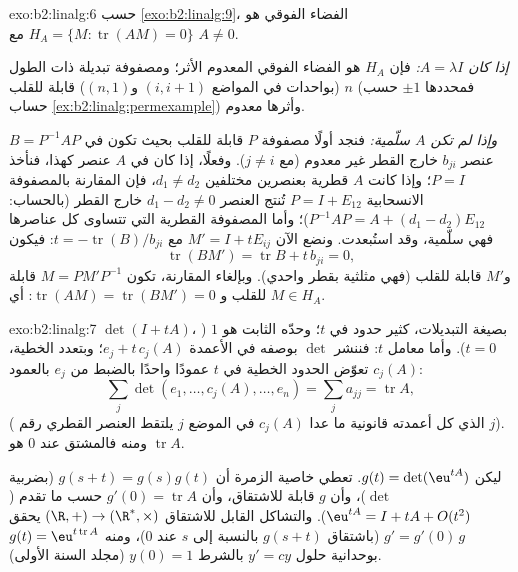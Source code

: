 \begin{solution}{exo:b2:linalg:6}
حسب \cref{exo:b2:linalg:9}، الفضاء الفوقي هو $H_A = \{M :
\operatorname{tr}(AM) = 0\}$ مع $A \neq 0$.

\emph{إذا كان $A = \lambda I$:} فإن $H_A$ هو الفضاء الفوقي المعدوم الأثر؛
ومصفوفة تبديلة  ذات الطول $n$ (بواحدات في المواضع $(i, i+1)$
و$(n, 1)$) قابلة للقلب (فمحددها $\pm 1$ حسب
حساب \cref{ex:b2:linalg:permexample}) وأثرها معدوم.

\emph{وإذا لم تكن $A$ سلّمية:} فنجد أولًا مصفوفة $P$ قابلة للقلب بحيث
تكون في $B = P^{-1}AP$ عنصر $b_{ji}$ خارج القطر غير معدوم (مع $j \neq
i$). وفعلًا، إذا كان في $A$ عنصر كهذا، فنأخذ $P = I$؛ وإذا كانت $A$
قطرية بعنصرين مختلفين $d_1 \neq d_2$، فإن المقارنة
بالمصفوفة الانسحابية $P = I + E_{12}$ تُنتج العنصر $d_1 - d_2 \neq 0$ خارج القطر
(بالحساب: $P^{-1}AP = A + (d_1 - d_2)E_{12}$)؛
وأما المصفوفة القطرية التي تتساوى كل عناصرها فهي
سلّمية، وقد استُبعدت. ونضع الآن $M' = I + tE_{ij}$ مع $t =
-\operatorname{tr}(B)/b_{ji}$: فيكون
\[
\operatorname{tr}(BM') = \operatorname{tr} B + t\,b_{ji} = 0,
\]
و$M'$ قابلة للقلب (فهي مثلثية بقطر واحدي). وبإلغاء
المقارنة، تكون $M = PM'P^{-1}$ قابلة للقلب و
$\operatorname{tr}(AM) = \operatorname{tr}(BM') = 0$: أي $M \in H_A$.
\end{solution}

\begin{solution}{exo:b2:linalg:7}
$\det(I + tA)$، بصيغة التبديلات، كثير حدود في $t$؛
وحدّه الثابت هو $1$ ($t = 0$). وأما معامل $t$: فننشر
$\det$ بوصفه  في الأعمدة $e_j + t\,c_j(A)$؛ وبتعدد
الخطية، تعوّض الحدود الخطية في $t$ عمودًا واحدًا بالضبط من $e_j$ بالعمود
$c_j(A)$:
\[
\sum_{j} \det(e_1, \dots, c_j(A), \dots, e_n)
= \sum_j a_{jj} = \operatorname{tr} A ,
\]
( الذي كل أعمدته قانونية ما عدا $c_j(A)$ في الموضع
$j$ يلتقط العنصر القطري رقم $j$). ومنه فالمشتق عند $0$ هو
$\operatorname{tr} A$.

ليكن $g(t) = \det(\eu^{tA})$. تعطي خاصية الزمرة أن $g(s + t) =
g(s)g(t)$ (بضربية $\det$)، وأن $g$ قابلة للاشتقاق، وأن
$g'(0) = \operatorname{tr} A$ حسب ما تقدم ($\eu^{tA} = I + tA +
O(t^2)$). والتشاكل القابل للاشتقاق $(\R, +) \to (\R^*, \times)$
يحقق $g' = g'(0)\,g$ (باشتقاق $g(s+t)$ بالنسبة إلى $s$ عند $0$)، ومنه
$g(t) = \eu^{t\operatorname{tr} A}$ بوحدانية حلول
$y' = cy$ بالشرط $y(0) = 1$ (مجلد السنة الأولى).
\end{solution}

